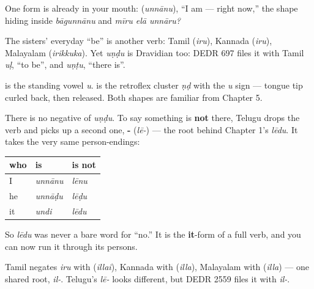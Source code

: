 One form is already in your mouth: \textbf{} (\emph{unnānu}), \textquotedblleft{}I am — right now,\textquotedblright{} the shape hiding inside \emph{bāgunnānu} and \emph{mīru elā unnāru?}

The sisters' everyday \textquotedblleft{}be\textquotedblright{} is another verb: Tamil \textbf{} (\emph{iru}), Kannada \textbf{} (\emph{iru}), Malayalam \textbf{} (\emph{irikkuka}). Yet \emph{uṇḍu} is Dravidian too: DEDR 697 files it with Tamil \emph{uḷ}, \textquotedblleft{}to be\textquotedblright{}, and \emph{uṇṭu}, \textquotedblleft{}there is\textquotedblright{}.

\begin{sounds}
\textbf{} is the standing vowel \emph{u}. \textbf{} is the retroflex cluster \emph{ṇḍ} with the \emph{u} sign — tongue tip curled back, then released. Both shapes are familiar from Chapter 5.
\end{sounds}

\begin{grammarlens}[title={Grammar Lens: Telugu's \textquotedblleft{}be\textquotedblright{} cannot be made negative}]
There is no negative of \emph{uṇḍu}. To say something is \textbf{not} there, Telugu drops the verb and picks up a second one, \textbf{-} (\emph{lē-}) — the root behind Chapter 1's \emph{lēdu}. It takes the very same person-endings:

\noindent
\begin{tabularx}{\linewidth}{@{}>{\raggedright\arraybackslash}X>{\raggedright\arraybackslash}X>{\raggedright\arraybackslash}X@{}}
\toprule
\textbf{who} & \textbf{is} & \textbf{is not} \\
\midrule
I & \emph{unnānu} & \emph{lēnu} \\
he & \emph{unnāḍu} & \emph{lēḍu} \\
it & \emph{undi} & \emph{lēdu} \\
\bottomrule
\end{tabularx}

So \emph{lēdu} was never a bare word for \textquotedblleft{}no.\textquotedblright{} It is the \textbf{it}-form of a full verb, and you can now run it through its persons.

Tamil negates \emph{iru} with \textbf{} (\emph{illai}), Kannada with \textbf{} (\emph{illa}), Malayalam with \textbf{} (\emph{illa}) — one shared root, \emph{il-}. Telugu's \emph{lē-} looks different, but DEDR 2559 files it with \emph{il-}.
\end{grammarlens}


